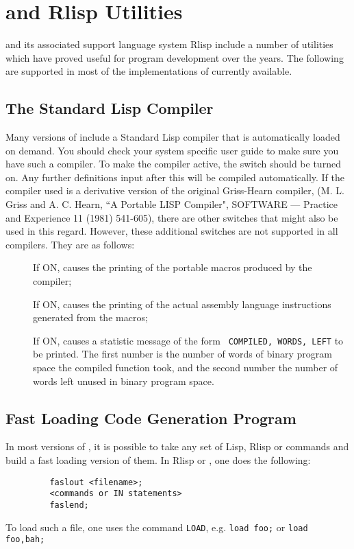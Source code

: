 \chapter{{\REDUCE} and Rlisp Utilities}

{\REDUCE} and its associated support language system Rlisp
include a number of utilities which have proved useful for program
development over the years.  The following are supported in most of the
implementations of {\REDUCE} currently available.

\section{The Standard Lisp Compiler}
\hypertarget{switch:COMP}{}

Many versions of {\REDUCE} include a Standard Lisp compiler that is
automatically loaded on demand.  You should check your system specific
user guide to make sure you have such a compiler.  To make the compiler
active, the switch  should be turned on.  Any
further definitions input after this will be compiled automatically.  If
the compiler used is a derivative version of the original Griss-Hearn
compiler,
(M. L. Griss and A.
C. Hearn, ``A Portable LISP Compiler", SOFTWARE --- Practice and Experience
11 (1981) 541-605),
there are other switches that might also be
used in this regard.  However, these additional switches are not supported
in all compilers.  They are as follows:
\begin{description}
\item[] If ON, causes the printing of the
portable macros produced by the compiler; 
%
\item[]  If ON, causes the printing of the
actual assembly language instructions generated from the macros; 
%
\item[] If ON, causes a statistic
message of the form \newline
\texttt{ COMPILED,  WORDS,  LEFT} \newline
to be printed.  The first number is the number of words of binary
program space the compiled function took, and the second number
the number of words left unused in binary program space. 
\end{description}

\section{Fast Loading Code Generation Program}
\label{sec-load}
\hypertarget{command:LOAD}{}
\hypertarget{command:LOAD_PACKAGE}{}
In most versions of {\REDUCE}, it is possible to take any set of Lisp, Rlisp
or {\REDUCE} commands and build a fast loading version of them. In Rlisp or
{\REDUCE}, one does the following:
\begin{verbatim}
         faslout <filename>;
         <commands or IN statements>
         faslend;
\end{verbatim}
To load such a file, one uses the command \texttt{LOAD},
e.g. \texttt{load foo;}
or \texttt{load foo,bah;}

